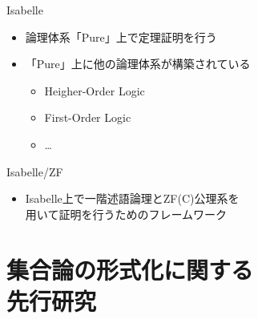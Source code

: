 \documentclass[17pt,aspectratio=169]{beamer}
\begin{document}


\begin{frame}{Isabelle}
    \begin{itemize}
        \item 論理体系「Pure」上で定理証明を行う
        \item 「Pure」上に他の論理体系が構築されている
              {\small \begin{itemize}
                  \item Heigher-Order Logic
                  \item First-Order Logic \\
                  \item \dots
              \end{itemize} }
    \end{itemize}
    \vspace{-10pt}
\end{frame}


\begin{frame}{Isabelle/ZF}
    \begin{itemize}
        \item Isabelle上で一階述語論理とZF(C)公理系を\\用いて証明を行うためのフレームワーク
    \end{itemize}
\end{frame}



\section{集合論の形式化に関する\\先行研究 }
\end{document}
